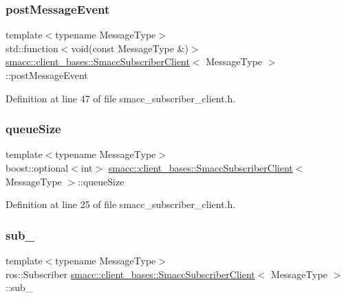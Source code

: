 \subsubsection{\texorpdfstring{post\+Message\+Event}{postMessageEvent}}
{\footnotesize\ttfamily template$<$typename Message\+Type$>$ \\
std\+::function$<$void(const Message\+Type \&)$>$ \hyperlink{classsmacc_1_1client__bases_1_1SmaccSubscriberClient}{smacc\+::client\+\_\+bases\+::\+Smacc\+Subscriber\+Client}$<$ Message\+Type $>$\+::post\+Message\+Event}



Definition at line 47 of file smacc\+\_\+subscriber\+\_\+client.\+h.

\mbox{\label{classsmacc_1_1client__bases_1_1SmaccSubscriberClient_a67f03f081d83476cdb7fd631b6aba450}} 
\subsubsection{\texorpdfstring{queue\+Size}{queueSize}}
{\footnotesize\ttfamily template$<$typename Message\+Type$>$ \\
boost\+::optional$<$int$>$ \hyperlink{classsmacc_1_1client__bases_1_1SmaccSubscriberClient}{smacc\+::client\+\_\+bases\+::\+Smacc\+Subscriber\+Client}$<$ Message\+Type $>$\+::queue\+Size}



Definition at line 25 of file smacc\+\_\+subscriber\+\_\+client.\+h.

\mbox{\label{classsmacc_1_1client__bases_1_1SmaccSubscriberClient_a0f69a1b0a284ae47f5d717c6ab95f089}} 
\subsubsection{\texorpdfstring{sub\+\_\+}{sub\_}}
{\footnotesize\ttfamily template$<$typename Message\+Type$>$ \\
ros\+::\+Subscriber \hyperlink{classsmacc_1_1client__bases_1_1SmaccSubscriberClient}{smacc\+::client\+\_\+bases\+::\+Smacc\+Subscriber\+Client}$<$ Message\+Type $>$\+::sub\+\_\+\hspace{0.3cm}{\ttfamily [private]}}



